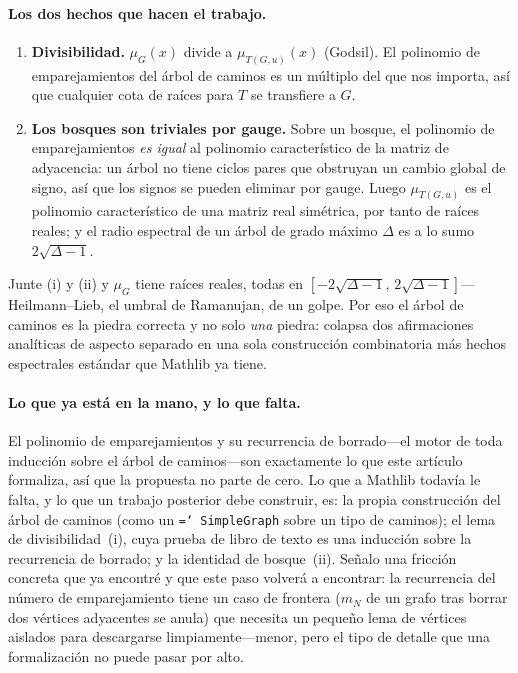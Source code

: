 \documentclass[11pt]{article}
\newcommand{\lean}[1]{\texttt{\hyphenchar\font=`\- #1}}
\begin{document}
\paragraph{Los dos hechos que hacen el trabajo.}
\begin{enumerate}\itemsep2pt
\item[(i)] \textbf{Divisibilidad.} $\mu_G(x)$ divide a $\mu_{T(G,u)}(x)$ (Godsil).
  El polinomio de emparejamientos del árbol de caminos es un múltiplo del que nos
  importa, así que cualquier cota de raíces para $T$ se transfiere a $G$.
\item[(ii)] \textbf{Los bosques son triviales por gauge.} Sobre un bosque, el
  polinomio de emparejamientos \emph{es igual} al polinomio característico de la
  matriz de adyacencia: un árbol no tiene ciclos pares que obstruyan un cambio
  global de signo, así que los signos se pueden eliminar por gauge. Luego
  $\mu_{T(G,u)}$ es el polinomio característico de una matriz real simétrica, por
  tanto de raíces reales; y el radio espectral de un árbol de grado máximo
  $\Delta$ es a lo sumo $2\sqrt{\Delta-1}$.
\end{enumerate}
Junte (i) y (ii) y $\mu_G$ tiene raíces reales, todas en
$[-2\sqrt{\Delta-1},\,2\sqrt{\Delta-1}]$---Heilmann--Lieb, el umbral de Ramanujan,
de un golpe. Por eso el árbol de caminos es la piedra correcta y no solo \emph{una}
piedra: colapsa dos afirmaciones analíticas de aspecto separado en una sola
construcción combinatoria más hechos espectrales estándar que Mathlib ya tiene.

\paragraph{Lo que ya está en la mano, y lo que falta.}
El polinomio de emparejamientos y su recurrencia de borrado---el motor de toda
inducción sobre el árbol de caminos---son exactamente lo que este artículo
formaliza, así que la propuesta no parte de cero. Lo que a Mathlib todavía le
falta, y lo que un trabajo posterior debe construir, es: la propia construcción
del árbol de caminos (como un \lean{SimpleGraph} sobre un tipo de caminos); el
lema de divisibilidad~(i), cuya prueba de libro de texto es una inducción sobre la
recurrencia de borrado; y la identidad de bosque~(ii). Señalo una fricción
concreta que ya encontré y que este paso volverá a encontrar: la recurrencia del
número de emparejamiento tiene un caso de frontera ($m_N$ de un grafo tras borrar
dos vértices adyacentes se anula) que necesita un pequeño lema de vértices
aislados para descargarse limpiamente---menor, pero el tipo de detalle que una
formalización no puede pasar por alto.
\end{document}
